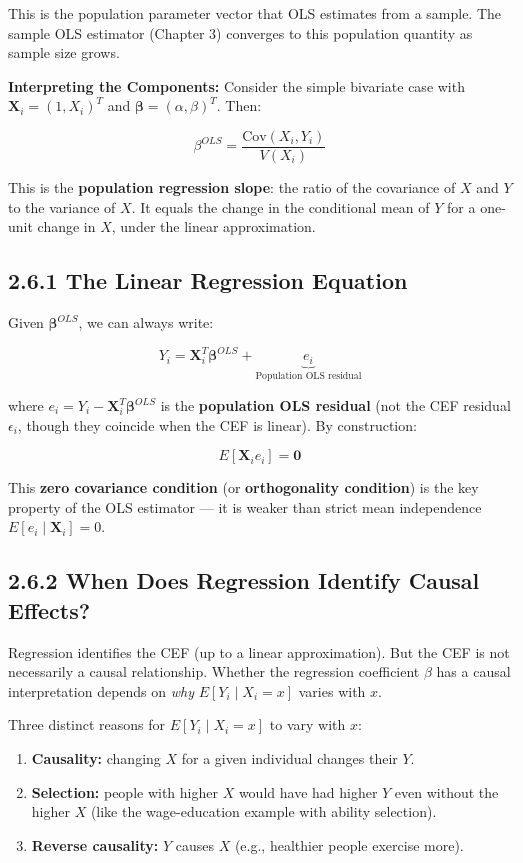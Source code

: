 This is the population parameter vector that OLS estimates from a sample. The sample OLS estimator (Chapter 3) converges to this population quantity as sample size grows.

\textbf{Interpreting the Components:} Consider the simple bivariate case with $\mathbf{X}_i = (1, X_i)^T$ and $\boldsymbol{\beta} = (\alpha, \beta)^T$. Then:

\[
\beta^{OLS} = \frac{\text{Cov}(X_i, Y_i)}{V(X_i)}
\]

This is the \textbf{population regression slope}: the ratio of the covariance of $X$ and $Y$ to the variance of $X$. It equals the change in the conditional mean of $Y$ for a one-unit change in $X$, under the linear approximation.

\subsection{2.6.1 The Linear Regression Equation}

Given $\boldsymbol{\beta}^{OLS}$, we can always write:

\[
Y_i = \mathbf{X}_i^T \boldsymbol{\beta}^{OLS} + \underbrace{e_i}_{\text{Population OLS residual}}
\]

where $e_i = Y_i - \mathbf{X}_i^T \boldsymbol{\beta}^{OLS}$ is the \textbf{population OLS residual} (not the CEF residual $\epsilon_i$, though they coincide when the CEF is linear). By construction:

\[
E[\mathbf{X}_i e_i] = \mathbf{0}
\]

This \textbf{zero covariance condition} (or \textbf{orthogonality condition}) is the key property of the OLS estimator --- it is weaker than strict mean independence $E[e_i \mid \mathbf{X}_i] = 0$.

\subsection{2.6.2 When Does Regression Identify Causal Effects?}

Regression identifies the CEF (up to a linear approximation). But the CEF is not necessarily a causal relationship. Whether the regression coefficient $\beta$ has a causal interpretation depends on \textit{why} $E[Y_i \mid X_i = x]$ varies with $x$.

Three distinct reasons for $E[Y_i \mid X_i = x]$ to vary with $x$:

\begin{enumerate}
\item \textbf{Causality:} changing $X$ for a given individual changes their $Y$.
\item \textbf{Selection:} people with higher $X$ would have had higher $Y$ even without the higher $X$ (like the wage-education example with ability selection).
\item \textbf{Reverse causality:} $Y$ causes $X$ (e.g., healthier people exercise more).
\end{enumerate}

